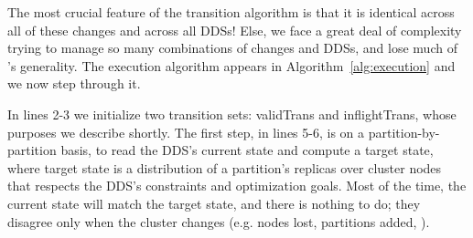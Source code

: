 

The most crucial feature of the \helix transition algorithm is that it is identical 
across all of these changes and across all DDSs!  Else, we face a great deal of
complexity trying to manage so many combinations of changes and DDSs, and lose
much of \helix's generality.   
The execution algorithm appears in Algorithm~\ref{alg:execution} and we now step
through it.


In lines 2-3 we initialize two transition sets: validTrans and
inflightTrans, whose purposes we describe shortly.  
The first step, in lines 5-6, is on a partition-by-partition basis, to 
read the DDS's current state and compute a target state, where
target state is a distribution of a partition's replicas over cluster nodes 
that respects the DDS's constraints and optimization goals.  Most of the time, 
the current state will match the target state, and there is nothing to do; they
disagree only when the cluster changes (e.g. nodes lost, partitions added,
\etc).

